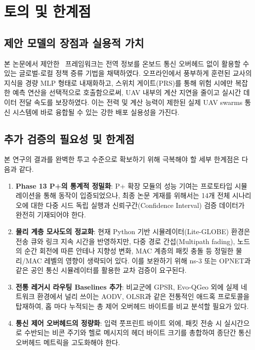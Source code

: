 \section{토의 및 한계점}
\label{sec:토의}

\subsection{제안 모델의 장점과 실용적 가치}
본 논문에서 제안한 \method\ 프레임워크는 전역 정보를 온보드 통신 오버헤드 없이 활용할 수 있는 글로벌-로컬 정책 증류 기법을 채택하였다. 오프라인에서 풍부하게 훈련된 교사의 지식을 경량 MLP 형태로 내재화하고, 스위치 게이트(PRS)를 통해 위험 시에만 복잡한 예측 연산을 선택적으로 호출함으로써, UAV 내부의 계산 지연을 줄이고 실시간 데이터 전달 속도를 보장하였다. 이는 전력 및 계산 능력이 제한된 실제 UAV swarms 통신 시스템에 바로 융합될 수 있는 강한 배포 실용성을 가진다.

\subsection{추가 검증의 필요성 및 한계점}
본 연구의 결과를 완벽한 투고 수준으로 확보하기 위해 극복해야 할 세부 한계점은 다음과 같다.
\begin{enumerate}
    \item \textbf{Phase 13 P+의 통계적 정밀화}: P+ 확장 모듈의 성능 기여는 프로토타입 시뮬레이션을 통해 동작이 입증되었으나, 최종 논문 게재를 위해서는 14개 전체 시나리오에 대한 다중 시드 독립 실행과 신뢰구간(Confidence Interval) 검증 데이터가 완전히 기재되어야 한다.
    \item \textbf{물리 계층 모사도의 정교화}: 현재 Python 기반 시뮬레이터(Lite-GLOBE) 환경은 전송 큐와 링크 지속 시간을 반영하지만, 다중 경로 간섭(Multipath fading), 노드의 순간 회전에 따른 안테나 지향성 변화, MAC 계층의 패킷 충돌 등 정밀한 물리/MAC 레벨의 영향이 생략되어 있다. 이를 보완하기 위해 ns-3 또는 OPNET과 같은 공인 통신 시뮬레이터를 활용한 교차 검증이 요구된다.
    \item \textbf{전통 레거시 라우팅 Baselines 추가}: 비교군에 GPSR, Evo-QGeo 외에 실제 네트워크 환경에서 널리 쓰이는 AODV, OLSR과 같은 전통적인 애드혹 프로토콜을 탑재하여, 홉 마다 누적되는 총 제어 오버헤드 바이트를 비교 분석할 필요가 있다.
    \item \textbf{통신 제어 오버헤드의 정량화}: 입력 풋프린트 바이트 외에, 패킷 전송 시 실시간으로 수반되는 비콘 주기와 헬로 메시지의 헤더 바이트 크기를 총합하여 종단간 통신 오버헤드 메트릭을 고도화해야 한다.
\end{enumerate}
